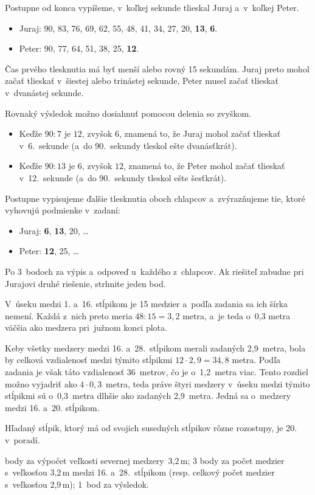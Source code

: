{%
Postupne od konca vypíšeme, v~koľkej sekunde tlieskal Juraj
a~v~koľkej Peter.
\begin{itemize}
\item Juraj: 90, 83, 76, 69, 62, 55, 48, 41, 34, 27, 20, {\bf13}, {\bf6}.
\item Peter: 90, 77, 64, 51, 38, 25, {\bf12}.
\end{itemize}
Čas prvého tlesknutia má byť menší alebo rovný 15 sekundám.
Juraj preto mohol začať tlieskať v~šiestej alebo trinástej sekunde, Peter musel
začať tlieskať v~dvanástej sekunde.

\ineriesenie
Rovnaký výsledok možno dosiahnuť pomocou delenia so zvyškom.
\begin{itemize}
\item
Keďže $90:7$ je $12$, zvyšok $6$, znamená to, že Juraj mohol začať tlieskať v~6.~sekunde (a~do 90.~sekundy tleskol ešte dvanásťkrát).
\item
Keďže $90:13$ je $6$, zvyšok $12$, znamená to, že Peter mohol začať tlieskať v~12.~sekunde (a~do 90.~sekundy tleskol ešte šesťkrát).
\end{itemize}
\noindent
Postupne vypisujeme ďalšie tlesknutia oboch chlapcov a~zvýrazňujeme tie, ktoré
vyhovujú podmienke v~zadaní:
\begin{itemize}
\item Juraj: {\bf6}, {\bf13}, 20, \dots
\item Peter: {\bf12}, 25, \dots
\end{itemize}


\hodnotenie
Po 3~bodoch za výpis a~odpoveď u~každého z~chlapcov.
Ak riešiteľ zabudne pri Jurajovi druhé riešenie, strhnite jeden bod.
\endhodnotenie
}

{%
V~úseku medzi 1. a~16. stĺpikom je 15 medzier a~podľa zadania sa ich šírka
nemení. Každá z~nich preto meria $48:15=3{,}2$ metra, a~je teda o~0{,}3 metra
väčšia ako medzera pri~južnom konci plota.

Keby všetky medzery medzi 16. a~28.~stĺpikom merali
zadaných 2{,}9~metra, bola by celková vzdialenosť medzi týmito
stĺpikmi $12\cdot2{,}9=34{,}8$ metra.
Podľa zadania je však táto vzdialenosť 36~metrov, čo je o~1{,}2~metra viac.
Tento rozdiel možno vyjadriť ako $4\cdot0{,}3$~metra, teda práve štyri medzery
v~úseku medzi týmito stĺpikmi sú o~0{,}3~metra dlhšie ako zadaných 2{,}9~metra.
Jedná sa o~medzery medzi 16. a~20. stĺpikom.

Hľadaný stĺpik, ktorý má od svojich
susedných stĺpikov rôzne rozostupy, je 20. v~poradí.

 body za výpočet veľkosti severnej medzery~3{,}2\,m;
3 body za počet medzier s~veľkosťou 3{,}2\,m medzi 16. a~28.~stĺpikom
(resp. celkový počet medzier s~veľkosťou 2{,}9\,m);
1~bod za výsledok.
\endhodnotenie
}

